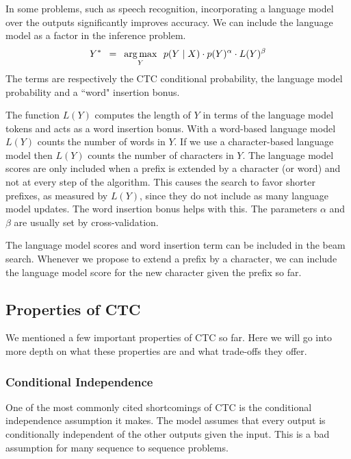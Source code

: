 
In some problems, such as speech recognition, incorporating a language model
over the outputs significantly improves accuracy. We can include the language
model as a factor in the inference problem.
\begin{align*}
Y^* \enspace = \enspace \operatorname*{arg\,max}_Y \enspace
        p(Y \mid X) \cdot p(Y)^\alpha \cdot L(Y)^\beta
\end{align*}
The terms are respectively the CTC conditional probability, the language model
probability and a ``word" insertion bonus.

The function $L(Y)$ computes the length of $Y$ in terms of the language model
tokens and acts as a word insertion bonus. With a word-based language model
$L(Y)$ counts the number of words in $Y$. If we use a character-based language
model then $L(Y)$ counts the number of characters in $Y$. The language model
scores are only included when a prefix is extended by a character (or word) and
not at every step of the algorithm. This causes the search to favor shorter
prefixes, as measured by $L(Y)$, since they do not include as many language
model updates. The word insertion bonus helps with this. The parameters
$\alpha$ and $\beta$ are usually set by cross-validation.

The language model scores and word insertion term can be included in the beam
search. Whenever we propose to extend a prefix by a character, we can include
the language model score for the new character given the prefix so far.

\subsection{Properties of CTC}

We mentioned a few important properties of CTC so far. Here we will go into
more depth on what these properties are and what trade-offs they offer.

\subsubsection{Conditional Independence}

One of the most commonly cited shortcomings of CTC is the conditional
independence assumption it makes. The model assumes that every output is
conditionally independent of the other outputs given the input. This is a bad
assumption for many sequence to sequence problems.

